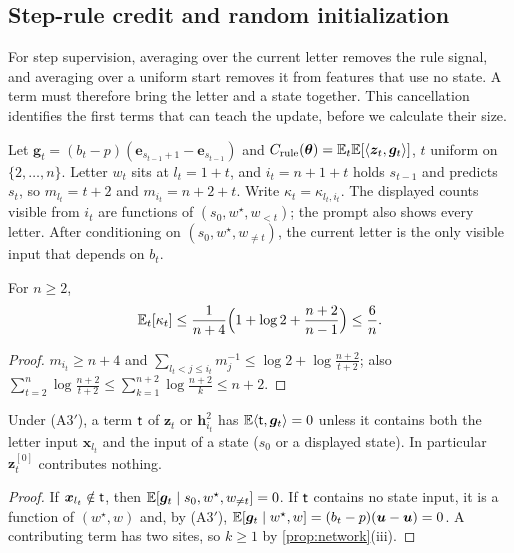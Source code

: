 \subsection{Step-rule credit and random initialization}

For step supervision, averaging over the current letter removes the rule signal, and averaging over a uniform start removes it
from features that use no state. A term must therefore bring the letter and a state together. This cancellation identifies the
first terms that can teach the update, before we calculate their size.

Let $\bm g_t=(b_t-p)(\bm e_{s_{t-1}+1}-\bm e_{s_{t-1}})$ and $C_{\mathrm{rule}}(\bm\theta)=\mathbb E_t\mathbb E[\langle\bm z_t,\bm g_t\rangle]$, $t$ uniform on $\{2,\ldots,n\}$. Letter $w_t$ sits at
$l_t=1+t$, and $i_t=n+1+t$ holds $s_{t-1}$ and predicts $s_t$, so $m_{l_t}=t+2$ and $m_{i_t}=n+2+t$. Write $\kappa_t=\kappa_{l_t,i_t}$. The displayed counts visible from $i_t$
are functions of $(s_0,w^\star,w_{<t})$; the prompt also shows every letter. After conditioning on $(s_0,w^\star,w_{\ne t})$, the current letter is the
only visible input that depends on $b_t$.

\begin{lemma}
\label{lem:dilution-average}
For $n\ge2$,
\begin{equation}
 \mathbb E_t[\kappa_t]\le\frac{1}{n+4}\Bigl(1+\log2+\frac{n+2}{n-1}\Bigr)\le\frac{6}{n} .
 \label{eq:dilution-avg}
\end{equation}
\end{lemma}

\begin{proof}
$m_{i_t}\ge n+4$ and $\sum_{l_t<j\le i_t}m_j^{-1}\le\log2+\log\frac{n+2}{t+2}$; also $\sum_{t=2}^n\log\frac{n+2}{t+2}\le\sum_{k=1}^{n+2}\log\frac{n+2}{k}\le n+2$.
\end{proof}

\begin{lemma}
\label{lem:rule-sites}
Under (A3$'$), a term $\mathsf t$ of $\bm z_t$ or $\bm h^2_{i_t}$ has $\mathbb E\langle\mathsf t,\bm g_t\rangle=0$ unless it contains both the letter input $\bm x_{l_t}$ and the input of a
state ($s_0$ or a displayed state). In particular $\bm z^{[0]}_t$ contributes nothing.
\end{lemma}

\begin{proof}
If $\bm x_{l_t}\notin\mathsf t$, then $\mathbb E[\bm g_t\mid s_0,w^\star,w_{\ne t}]=0$. If $\mathsf t$ contains no state input, it is a function of $(w^\star,w)$ and, by (A3$'$),
$\mathbb E[\bm g_t\mid w^\star,w]=(b_t-p)(\bm u-\bm u)=0$. A contributing term has two sites, so $k\ge1$ by \cref{prop:network}(iii).
\end{proof}

